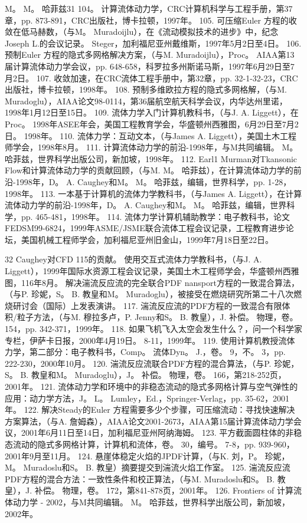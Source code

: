 \documentclass[UTF8,11pt,a4paper,openany,fontset=fandol]{ctexbook}
\begin{document}
M。 M。 哈菲兹31 104。 计算流体动力学，CRC计算机科学与工程手册，第37章，pp. 873-891，CRC出版社，博卡拉顿，1997年。 105. 可压缩Euler 方程的收敛在低马赫数，（与M。 Muradoijlu），在《流动模拟技术的进步》中，纪念Joseph L.的会议记录。 Steger，加利福尼亚州戴维斯，1997年5月2日至4日。 106. 预制Euler 方程的隐式多网格解决方案，（与M. Muradoijlu），Proc。 AIAA第13届计算流体动力学会议，pp. 648-658，科罗拉多州斯诺马斯，1997年6月29日至7月2日。 107. 收敛加速，在CRC流体工程手册中，第32章，pp. 32-1-32-23，CRC出版社，博卡拉顿，1998年。 108. 预制多维欧拉方程的隐式多网格解，（与M. Muradoglu），AIAA论文98-0114，第36届航空航天科学会议，内华达州里诺，1998年1月12日至15日。 109. 流体力学入门计算机教科书，（与J. A. Liggett），在Proc。 1998年ASEE年会，美国工程教育学会，华盛顿州西雅图，6月29日至7月2日。 1998年。 110. 流体力学：互动文本，（与James A. Liggett），美国土木工程师学会，1998年8月。 111. 计算流体动力学的前沿-1998年，与M共同编辑。 M。 哈菲兹，世界科学出版公司，新加坡，1998年。 112. Earl1 Murman对Tkansonic Flow和计算流体动力学的贡献回顾，（与M. M。 哈菲兹），在计算流体动力学的前沿-1998年，D。 A. Caughey和M。 M。 哈菲兹，编辑，世界科学，pp. 1-28，1998年。 113. 一本基于计算机的流体力学教科书，（与James A. Liggett），在计算流体动力学的前沿-1998年，D。 A. Caughey和M。 M。 哈菲兹，编辑，世界科学，pp. 465-481，1998年。 114. 流体力学计算机辅助教学：电子教科书，论文FEDSM99-6824，1999年ASME/JSME联合流体工程会议记录，工程教育进步论坛，美国机械工程师学会，加利福尼亚州旧金山，1999年7月18日至22日。

32 Caughey对CFD 115的贡献。 使用交互式流体力学教科书，（与J. A. Liggett），1999年国际水资源工程会议记录，美国土木工程师学会，华盛顿州西雅图，116年8月。 解决湍流反应流的完全联合PDF nansport方程的一致混合算法，（与P. 珍妮，S。 B. 教皇和M。 Muradoglu），被接受在燃烧研究所第二十八次燃烧研讨会（国际）上发表演讲。 117. 湍流反应流的PDF方程的一致混合有限体积/粒子方法，（与M. 穆拉多卢，P. Jenny和S。 B. 教皇），J. 补偿。 物理，卷。 154，pp. 342-371，1999年。 118. 如果飞机飞入太空会发生什么？，问一个科学家专栏，伊萨卡日报，2000年4月19日。 8-11，1999年。 119. 使用计算机教授流体力学，第二部分：电子教科书，Comp。 流体Dyn。 J.，卷。 9，不。 3，pp. 222-230，2000年10月。 120. 湍流反应流联合PDF方程的混合算法，（与P. 珍妮，S。 B. 教皇和M。 Muradoglu），J。 补偿。 物理，卷。 166，第218-252页，2001年。 121. 流体动力学和环境中的非稳态流动的隐式多网格计算与空气弹性的应用：动力学方法，J。 L。 Lumley，Ed.，Springer-Verlag，pp. 35-62，2001年。 122. 解决Steady的Euler 方程需要多少个步骤，可压缩流动：寻找快速解决方案算法，（与A. 詹姆森），AIAA论文2001-2673，AIAA第15届计算流体动力学会议，2001年6月11日至14日，加利福尼亚州阿纳海姆。 123. 平方截面圆柱体的非稳态流动的隐式多网格计算，计算机和流体，卷。 30，编号。 7-8，pp. 939-960，2001年9月至11月。 124. 悬崖体稳定火焰的JPDF计算，（与K. 刘，P。 珍妮，M。 Muradoslu和S。 B. 教皇）摘要提交到湍流火焰工作室。 125. 湍流反应流PDF方程的混合方法：一致性条件和校正算法，（与M. Muradoslu和S。 B. 教皇），J. 补偿。 物理，卷。 172，第841-878页，2001年。 126. Frontiers of 计算流体动力学 - 2002，与M共同编辑。 M。 哈菲兹，世界科学出版公司，新加坡，2002年。
\end{document}
